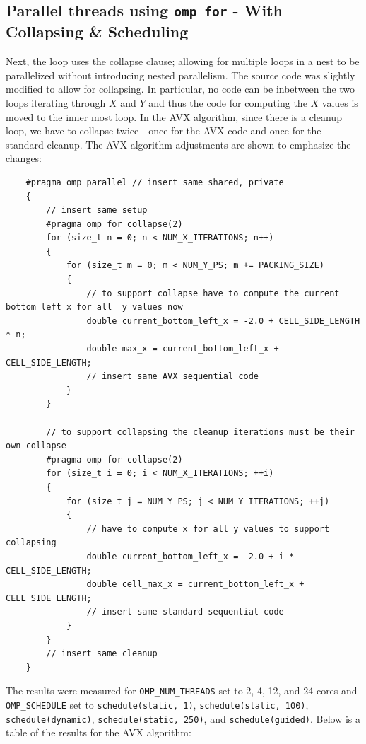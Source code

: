 \documentclass{article}
\begin{document}
\subsection{Parallel threads using \texttt{omp for} - With Collapsing \& Scheduling}
Next, the loop uses the collapse clause; allowing for multiple loops in a nest to 
be parallelized without introducing nested parallelism. The source code was slightly 
modified to allow for collapsing. In particular, no code can be inbetween the two loops 
iterating through $X$ and $Y$ and thus the code for computing the $X$ values is moved to the 
inner most loop. In the AVX algorithm, since there is a cleanup loop, we have to collapse twice - once for the AVX code and once for the standard cleanup.
The AVX algorithm adjustments are shown to emphasize the changes:
\newpage
\begin{lstlisting}
    #pragma omp parallel // insert same shared, private
    {
        // insert same setup
        #pragma omp for collapse(2)
        for (size_t n = 0; n < NUM_X_ITERATIONS; n++)
        {
            for (size_t m = 0; m < NUM_Y_PS; m += PACKING_SIZE)
            {
                // to support collapse have to compute the current bottom left x for all  y values now
                double current_bottom_left_x = -2.0 + CELL_SIDE_LENGTH * n;
                double max_x = current_bottom_left_x + CELL_SIDE_LENGTH;
                // insert same AVX sequential code
            }
        }

        // to support collapsing the cleanup iterations must be their own collapse
        #pragma omp for collapse(2)
        for (size_t i = 0; i < NUM_X_ITERATIONS; ++i)
        {
            for (size_t j = NUM_Y_PS; j < NUM_Y_ITERATIONS; ++j)
            {
                // have to compute x for all y values to support collapsing
                double current_bottom_left_x = -2.0 + i * CELL_SIDE_LENGTH;
                double cell_max_x = current_bottom_left_x + CELL_SIDE_LENGTH;
                // insert same standard sequential code
            }
        }
        // insert same cleanup
    }
\end{lstlisting}
The results were measured for \texttt{OMP\_NUM\_THREADS} set to 2, 4, 12, and 24 cores and \texttt{OMP\_SCHEDULE} set to
\texttt{schedule(static, 1)}, \texttt{schedule(static, 100)}, \texttt{schedule(dynamic)}, \texttt{schedule(static, 250)}, and \texttt{schedule(guided)}. Below 
is a table of the results for the AVX algorithm:
\end{document}
